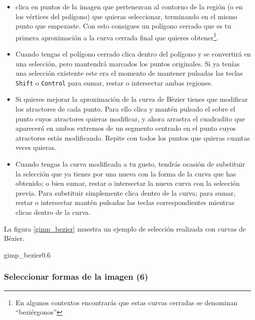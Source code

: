 \begin{itemize}

\item clica en  puntos de la imagen que pertenezcan  al contorno de la
región  (o en  los  vértices del  polígono)  que quieras  seleccionar,
terminando  en el  mismo punto  que empezaste.  Con esto  consigues un
polígono cerrado  que es  tu primera aproximación  a la  curva cerrada
final  que quieres  obtener\footnote{En algunos  contextos encontrarás
que estas curvas cerradas se denominan ``beziérgonos''}.

\item Cuando tengas el polígono cerrado clica dentro del polígono y se
convertirá  en  una  selección,  pero mantendrá  marcados  los  puntos
originales. Si ya  tenías una selección existente este  era el momento
de  mantener pulsadas  las teclas  {\tt  Shift} o  {\tt Control}  para
sumar, restar o intersectar ambas regiones.

\item Si quieres mejorar la aproximación  de la curva de Bèzier tienes
que modificar los  atractores de cada punto. Para ello  clica y mantén
pulsado el \bir  sobre el punto cuyos atractores  quieras modificar, y
ahora arrastra  el cuadradito  que aparecerá en  ambos extremos  de un
segmento  centrado en  el  punto cuyos  atractores estás  modificando.
Repite con todos los puntos que quieras cuantas veces quieras.

\item Cuando tengas la curva modificada a tu gusto, tendrás ocasión de
substituir la selección que ya tienes por una nueva con la forma de la
curva que  has obtenido; o bien  sumar, restar o intersectar  la nueva
curva  con  la selección  previa.  Para  substituir simplemente  clica
dentro de la  curva; para sumar, restar o  intersectar mantén pulsadas
las teclas correspondientes mientras clicas dentro de la curva.

\end{itemize}

La figura \ref{gimp_bezier} muestra  un ejemplo de selección realizada
con curvas de Bèzier.

\begin{figura}{gimp_bezier}{0.6}
\caption{Selección realizada con curvas de Bèzier}
\end{figura}

\subsubsection{Seleccionar formas de la imagen (6)}

